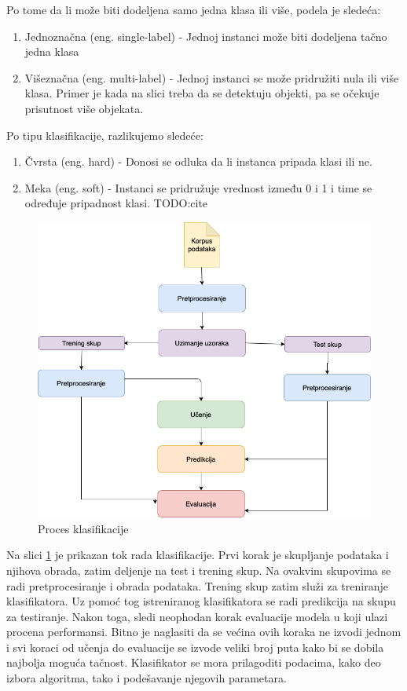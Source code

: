 \documentclass[12pt,oneside]{memoir}
\begin{document}
Po tome da li može biti dodeljena samo jedna klasa ili više, podela je sledeća:

\begin{enumerate}
\item Jednoznačna (eng. single-label) - Jednoj instanci može biti dodeljena tačno jedna klasa
\item Višeznačna (eng.  multi-label) - Jednoj instanci se može pridružiti nula ili više klasa. Primer je kada na slici treba da se detektuju objekti, pa se očekuje prisutnost više objekata.
\end{enumerate}

Po tipu klasifikacije, razlikujemo sledeće:

\begin{enumerate}
\item Čvrsta (eng. hard) - Donosi se odluka da li instanca pripada klasi ili ne. 
\item Meka (eng. soft) - Instanci se pridružuje vrednost između 0 i 1 i time se određuje pripadnost klasi. TODO:cite
\end{enumerate}

\begin{figure}[h!]
\centering
\includegraphics[width=.7\textwidth]{images/workflow.png}
\caption{Proces klasifikacije}
\label{img:workflow}
\end{figure}

Na slici \ref{img:workflow} je prikazan tok rada klasifikacije. Prvi korak je skupljanje podataka i njihova obrada, zatim deljenje na test i trening skup. Na ovakvim skupovima se radi pretprocesiranje i obrada podataka. Trening skup zatim služi za treniranje klasifikatora. Uz pomoć tog istreniranog klasifikatora se radi predikcija na skupu za testiranje. Nakon toga, sledi neophodan korak evaluacije modela u koji ulazi procena performansi. Bitno je naglasiti da se većina ovih koraka ne izvodi jednom i svi koraci od učenja do evaluacije se izvode veliki broj puta kako bi se dobila najbolja moguća tačnost. Klasifikator se mora prilagoditi podacima, kako deo izbora algoritma, tako i podešavanje njegovih parametara.
\end{document}
